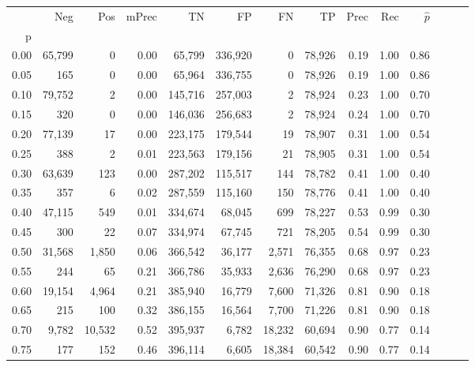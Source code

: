 \begin{tabular}{rrrrrrrrrrrrrr}
\toprule
{} &     Neg &     Pos & mPrec &       TN &       FP &      FN &      TP &  Prec &   Rec & $\hat{p}$ \\
p    &         &         &       &          &          &         &         &       &       &           \\
\midrule
0.00 &  65,799 &       0 &  0.00 &   65,799 &  336,920 &       0 &  78,926 &  0.19 &  1.00 &      0.86 \\
0.05 &     165 &       0 &  0.00 &   65,964 &  336,755 &       0 &  78,926 &  0.19 &  1.00 &      0.86 \\
0.10 &  79,752 &       2 &  0.00 &  145,716 &  257,003 &       2 &  78,924 &  0.23 &  1.00 &      0.70 \\
0.15 &     320 &       0 &  0.00 &  146,036 &  256,683 &       2 &  78,924 &  0.24 &  1.00 &      0.70 \\
0.20 &  77,139 &      17 &  0.00 &  223,175 &  179,544 &      19 &  78,907 &  0.31 &  1.00 &      0.54 \\
0.25 &     388 &       2 &  0.01 &  223,563 &  179,156 &      21 &  78,905 &  0.31 &  1.00 &      0.54 \\
0.30 &  63,639 &     123 &  0.00 &  287,202 &  115,517 &     144 &  78,782 &  0.41 &  1.00 &      0.40 \\
0.35 &     357 &       6 &  0.02 &  287,559 &  115,160 &     150 &  78,776 &  0.41 &  1.00 &      0.40 \\
0.40 &  47,115 &     549 &  0.01 &  334,674 &   68,045 &     699 &  78,227 &  0.53 &  0.99 &      0.30 \\
0.45 &     300 &      22 &  0.07 &  334,974 &   67,745 &     721 &  78,205 &  0.54 &  0.99 &      0.30 \\
0.50 &  31,568 &   1,850 &  0.06 &  366,542 &   36,177 &   2,571 &  76,355 &  0.68 &  0.97 &      0.23 \\
0.55 &     244 &      65 &  0.21 &  366,786 &   35,933 &   2,636 &  76,290 &  0.68 &  0.97 &      0.23 \\
0.60 &  19,154 &   4,964 &  0.21 &  385,940 &   16,779 &   7,600 &  71,326 &  0.81 &  0.90 &      0.18 \\
0.65 &     215 &     100 &  0.32 &  386,155 &   16,564 &   7,700 &  71,226 &  0.81 &  0.90 &      0.18 \\
0.70 &   9,782 &  10,532 &  0.52 &  395,937 &    6,782 &  18,232 &  60,694 &  0.90 &  0.77 &      0.14 \\
0.75 &     177 &     152 &  0.46 &  396,114 &    6,605 &  18,384 &  60,542 &  0.90 &  0.77 &      0.14 \\

\end{tabular}
